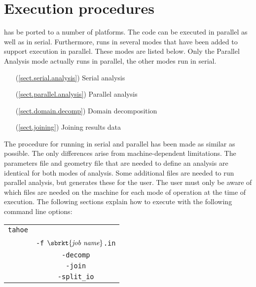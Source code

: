 
\section{Execution procedures}
\tahoe has be ported to a number of platforms.  The code can be executed in
parallel as well as in serial.  Furthermore, \tahoe runs in several modes
that have been added to support execution in parallel.  These modes are
listed below.  Only the Parallel Analysis mode actually runs in parallel,
the other modes run in serial.
\begin{itemize}
\item[(\ref{sect.serial.analysis})] Serial analysis
\item[(\ref{sect.parallel.analysis})] Parallel analysis
\item[(\ref{sect.domain.decomp})] Domain decomposition
\item[(\ref{sect.joining})] Joining results data
\end{itemize}
The procedure for running in serial and parallel has been made as similar
as possible.  The only differences arise from machine-dependent
limitations.  The parameters file and geometry file that are needed to
define an analysis are identical for both modes of analysis.  Some
additional files are needed to run parallel analysis, but \tahoe generates
these for the user.  The user must only be aware of which files are needed
on the machine for each mode of operation at the time of execution.  The
following sections explain how to execute \tahoe with the following command
line options:
\begin{center}
\begin{tabular}[c]{c c}
\parbox[b]{2.0in}{\raggedleft \texttt{tahoe}} &\parbox[b]{2.0in}{}\\
&\parbox[b]{2.0in}{\texttt{-f} $\sbrkt{\textit{job name}}$\texttt{.in}}\\
&\parbox[b]{2.0in}{\texttt{-decomp}}\\
&\parbox[b]{2.0in}{\texttt{-join}}\\
&\parbox[b]{2.0in}{\texttt{-split\_io}}\\
\end{tabular}
\end{center}

